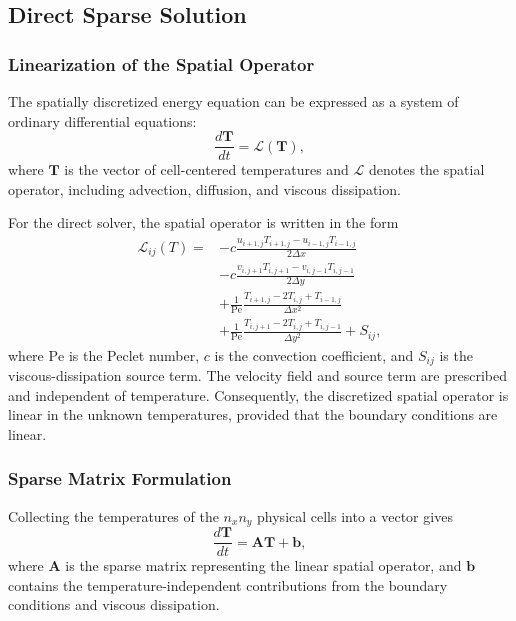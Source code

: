\subsection{Direct Sparse Solution}
\label{subsec:direct_solution}

\subsubsection{Linearization of the Spatial Operator}

The spatially discretized energy equation can be expressed as
a system of ordinary differential equations:
\begin{equation}
\frac{d\mathbf{T}}{dt}
=
\mathcal{L}(\mathbf{T}),
\label{eq:direct_ode}
\end{equation}
where $\mathbf{T}$ is the vector of cell-centered temperatures
and $\mathcal{L}$ denotes the spatial operator, including
advection, diffusion, and viscous dissipation.

For the direct solver, the spatial operator is written in the
form
\begin{align}
\mathcal{L}_{ij}(T)
={}&
-c\frac{
u_{i+1,j}T_{i+1,j}
-u_{i-1,j}T_{i-1,j}
}{2\Delta x}
\nonumber\\
&-
c\frac{
v_{i,j+1}T_{i,j+1}
-v_{i,j-1}T_{i,j-1}
}{2\Delta y}
\nonumber\\
&+
\frac{1}{\mathrm{Pe}}
\frac{
T_{i+1,j}-2T_{i,j}+T_{i-1,j}
}{\Delta x^2}
\nonumber\\
&+
\frac{1}{\mathrm{Pe}}
\frac{
T_{i,j+1}-2T_{i,j}+T_{i,j-1}
}{\Delta y^2}
+S_{ij},
\label{eq:direct_spatial_operator}
\end{align}
where $\mathrm{Pe}$ is the Peclet number, $c$ is the convection
coefficient, and $S_{ij}$ is the viscous-dissipation source
term. The velocity field and source term are prescribed and
independent of temperature. Consequently, the discretized
spatial operator is linear in the unknown temperatures,
provided that the boundary conditions are linear.

\subsubsection{Sparse Matrix Formulation}

Collecting the temperatures of the $n_xn_y$ physical cells
into a vector gives
\begin{equation}
\boxed{
\frac{d\mathbf{T}}{dt}
=
\mathbf{A}\mathbf{T}+\mathbf{b},
}
\label{eq:direct_semidiscrete}
\end{equation}
where $\mathbf{A}$ is the sparse matrix representing the
linear spatial operator, and $\mathbf{b}$ contains the
temperature-independent contributions from the boundary
conditions and viscous dissipation.

